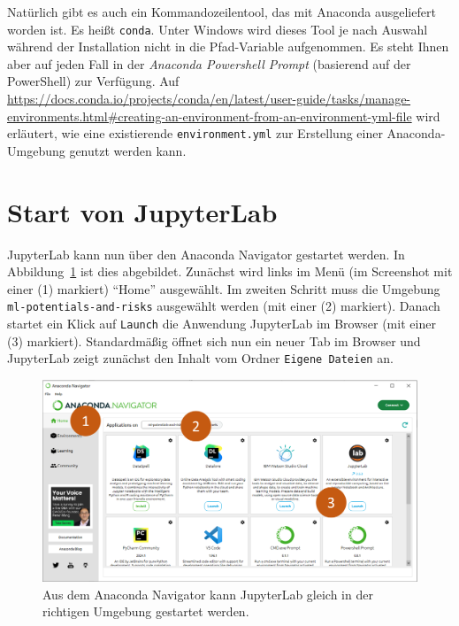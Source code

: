 \documentclass{tufte-handout}
\begin{document}
Natürlich gibt es auch ein Kommandozeilentool, das mit Anaconda ausgeliefert worden ist.
Es heißt \texttt{conda}.
Unter Windows wird dieses Tool je nach Auswahl während der Installation nicht in die Pfad-Variable aufgenommen.
Es steht Ihnen aber auf jeden Fall in der
\emph{Anaconda Powershell Prompt} (basierend auf der PowerShell)
zur Verfügung.
Auf
\url{https://docs.conda.io/projects/conda/en/latest/user-guide/tasks/manage-environments.html#creating-an-environment-from-an-environment-yml-file}
wird erläutert, wie eine existierende \texttt{environment.yml} zur Erstellung einer Anaconda-Umgebung genutzt werden kann.

\section{Start von JupyterLab}

JupyterLab kann nun über den Anaconda Navigator gestartet werden.
In Abbildung~\ref{fig:start-jupyterlab} ist dies abgebildet.
Zunächst wird links im Menü
(im Screenshot mit einer (1) markiert)
\enquote{Home} ausgewählt.
Im zweiten Schritt muss die Umgebung
\texttt{ml-potentials-and-risks}
ausgewählt werden
(mit einer (2) markiert).
Danach startet ein Klick auf \texttt{Launch} die Anwendung JupyterLab im Browser
(mit einer (3) markiert).
Standardmäßig öffnet sich nun ein neuer Tab im Browser und JupyterLab zeigt zunächst den Inhalt vom Ordner \texttt{Eigene Dateien} an.

\begin{figure}[h]
  \includegraphics{anaconda-navigator-jupyterlab--mit-reihenfolge}
  \caption{Aus dem Anaconda Navigator kann JupyterLab gleich in der richtigen Umgebung gestartet werden.}%
\label{fig:start-jupyterlab}
\end{figure}
\end{document}
